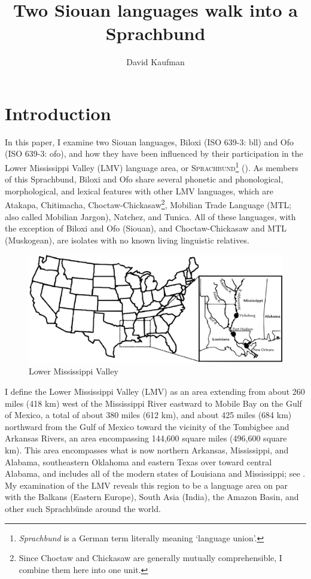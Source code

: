 \documentclass[output=paper]{LSP/langsci}
\author{David Kaufman}
\title{Two Siouan languages walk into a Sprachbund}
\begin{document}
\section{Introduction}
In this paper, I examine two Siouan languages, Biloxi (ISO 639-3: bll) and Ofo (ISO 639-3: ofo), and how they have been influenced by their participation in the Lower Mississippi Valley (LMV) language area, or \textsc{Sprachbund}\footnote{\emph{Sprachbund} is a German term literally meaning `language union'.} (\citealt[3]{Kaufman2014}). As members of this Sprachbund, Biloxi and Ofo share several phonetic and phonological, morphological, and lexical features with other LMV languages, which are Atakapa, Chitimacha, Choctaw-Chickasaw\footnote{Since Choctaw and Chickasaw are generally mutually comprehensible, I combine them here into one unit.}, Mobilian Trade Language (MTL; also called Mobilian Jargon), Natchez, and Tunica. All of these languages, with the exception of Biloxi and Ofo (Siouan), and Choctaw-Chickasaw and MTL (Muskogean), are isolates with no known living linguistic relatives. 

\begin{figure}
\caption{Lower Mississippi Valley} \label{map}
\includegraphics[width=12cm]{figures/Kaufman1}
\end{figure}

I define the Lower Mississippi Valley (LMV) as an area extending from about 260 miles (418 km) west of the Mississippi River eastward to Mobile Bay on the Gulf of Mexico, a total of about 380 miles (612 km), and about 425 miles (684 km) northward from the Gulf of Mexico toward the vicinity of the Tombigbee and Arkansas Rivers, an area encompassing 144,600 square miles (496,600 square km). This area encompasses what is now northern Arkansas, Mississippi, and Alabama, southeastern Oklahoma and eastern Texas over toward central Alabama, and includes all of the modern states of Louisiana and Mississippi; see . My examination of the LMV reveals this region to be a language area on par with the Balkans (Eastern Europe), South Asia (India), the Amazon Basin, and other such Sprachbünde around the world.
\end{document}
